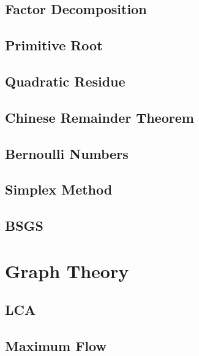\subsection{Factor Decomposition}
\raggedbottom
\hrulefill
\subsection{Primitive Root}
\raggedbottom
\hrulefill
\subsection{Quadratic Residue}
\raggedbottom
\hrulefill
\subsection{Chinese Remainder Theorem}
\raggedbottom
\hrulefill
\subsection{Bernoulli Numbers}
\raggedbottom
\hrulefill
\subsection{Simplex Method}
\raggedbottom
\hrulefill
\subsection{BSGS}
\raggedbottom
\hrulefill

\section{Graph Theory}
\subsection{LCA}
\raggedbottom
\hrulefill
\subsection{Maximum Flow}
\raggedbottom
\hrulefill
